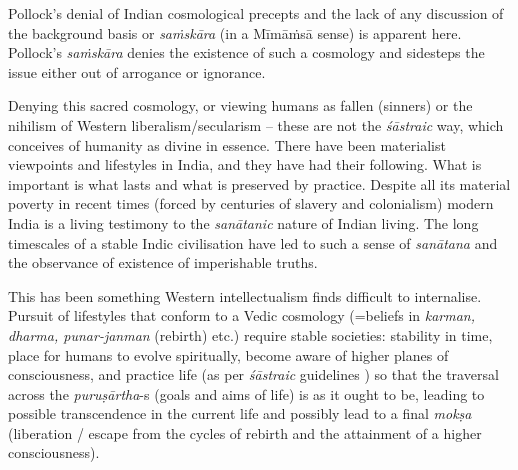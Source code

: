 Pollock's denial of Indian cosmological precepts and the lack of any discussion of the background basis or {\sl saṁskāra} (in a Mīmāṁsā sense) is apparent here. Pollock's {\sl saṁskāra} denies the existence of such a cosmology and sidesteps the issue either out of arrogance or ignorance.

Denying this sacred cosmology, or viewing humans as fallen (sinners) or the nihilism of Western liberalism/secularism -- these are not the {\sl śāstraic} way, which conceives of humanity as divine in essence. There have been materialist viewpoints and lifestyles in India, and they have had their following. What is important is what lasts and what is preserved by practice. Despite all its material poverty in recent times (forced by centuries of slavery and colonialism) modern India is a living testimony to the {\sl sanātanic} nature of Indian living. The long timescales of a stable Indic civilisation have led to such a sense of {\sl sanātana} and the observance of existence of imperishable truths.

This has been something Western intellectualism finds difficult to internalise. Pursuit of lifestyles that conform to a Vedic cosmology (=beliefs in {\sl karman, dharma, punar-janman} (rebirth) etc.) require stable societies: stability in time, place for humans to evolve spiritually, become aware of higher planes of consciousness, and practice life (as per {\sl śāstraic} guidelines ) so that the traversal across the \hbox{{\sl puruṣārtha}-s} (goals and aims of life) is as it ought to be, leading to  possible transcendence in the current life and possibly lead to a final {\sl mokṣa}  (liberation / escape from the cycles of rebirth and the attainment of a higher consciousness).

